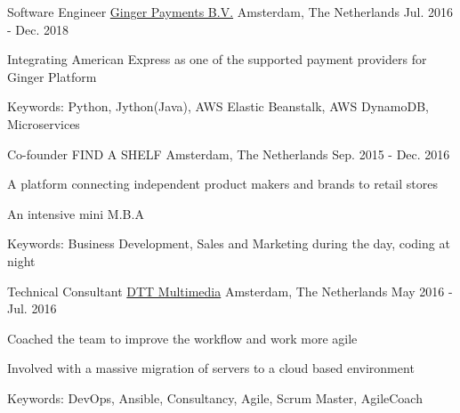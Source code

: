 \begin{cventries}
  \cventry
    {Software Engineer} %
    {\href{https://www.gingerpayments.com/}{Ginger Payments B.V.}} %
    {Amsterdam, The Netherlands} %
    {Jul. 2016 - Dec. 2018} %
    {
      \begin{cvitems} %
        \item {Integrating American Express as one of the supported payment providers for Ginger Platform}
        \item {Keywords: Python, Jython(Java), AWS Elastic Beanstalk, AWS DynamoDB, Microservices}
      \end{cvitems}
    }


  \cventry
  {Co-founder} %
  {FIND A SHELF} %
  {Amsterdam, The Netherlands} %
  {Sep. 2015 - Dec. 2016} %
   {
          \begin{cvitems} %
            \item {A platform connecting independent product makers and brands to retail stores}
            \item {An intensive mini M.B.A}
            \item {Keywords: Business Development, Sales and Marketing during the day, coding at night}
          \end{cvitems}
        }

  \cventry
    {Technical Consultant} %
    {\href{https://d-tt.nl/}{DTT Multimedia}} %
    {Amsterdam, The Netherlands} %
    {May 2016 - Jul. 2016} %
      {
          \begin{cvitems} %
            \item {Coached the team to improve the workflow and work more agile}
            \item {Involved with a massive migration of servers to a cloud based environment}
            \item {Keywords: DevOps, Ansible, Consultancy, Agile, Scrum Master, AgileCoach}
          \end{cvitems}
        }


\end{cventries}
